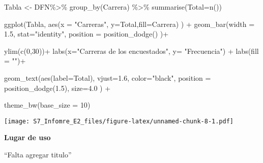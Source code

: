 \documentclass[
]{article}
\newenvironment{Shaded}{\begin{snugshade}}{\end{snugshade}}
\newcommand{\AttributeTok}[1]{\textcolor[rgb]{0.77,0.63,0.00}{#1}}
\newcommand{\DecValTok}[1]{\textcolor[rgb]{0.00,0.00,0.81}{#1}}
\newcommand{\FloatTok}[1]{\textcolor[rgb]{0.00,0.00,0.81}{#1}}
\newcommand{\FunctionTok}[1]{\textcolor[rgb]{0.00,0.00,0.00}{#1}}
\newcommand{\NormalTok}[1]{#1}
\newcommand{\OtherTok}[1]{\textcolor[rgb]{0.56,0.35,0.01}{#1}}
\newcommand{\SpecialCharTok}[1]{\textcolor[rgb]{0.00,0.00,0.00}{#1}}
\newcommand{\StringTok}[1]{\textcolor[rgb]{0.31,0.60,0.02}{#1}}
\begin{document}
\begin{Shaded}
\begin{Highlighting}[]
\NormalTok{Tabla }\OtherTok{\textless{}{-}}\NormalTok{ DFN}\SpecialCharTok{\%\textgreater{}\%} \FunctionTok{group\_by}\NormalTok{(Carrera) }\SpecialCharTok{\%\textgreater{}\%} \FunctionTok{summarise}\NormalTok{(}\AttributeTok{Total=}\FunctionTok{n}\NormalTok{())   }
    
\FunctionTok{ggplot}\NormalTok{(Tabla, }\FunctionTok{aes}\NormalTok{(}\AttributeTok{x =} \StringTok{"Carreras"}\NormalTok{, }\AttributeTok{y=}\NormalTok{Total,}\AttributeTok{fill=}\NormalTok{Carrera) ) }\SpecialCharTok{+}    
  \FunctionTok{geom\_bar}\NormalTok{(}\AttributeTok{width =} \FloatTok{1.5}\NormalTok{, }\AttributeTok{stat=}\StringTok{"identity"}\NormalTok{,              }
           \AttributeTok{position =} \FunctionTok{position\_dodge}\NormalTok{()                 )}\SpecialCharTok{+}  
  
  \FunctionTok{ylim}\NormalTok{(}\FunctionTok{c}\NormalTok{(}\DecValTok{0}\NormalTok{,}\DecValTok{30}\NormalTok{))}\SpecialCharTok{+}
  \FunctionTok{labs}\NormalTok{(}\AttributeTok{x=}\StringTok{"Carreras de los encuestados"}\NormalTok{, }\AttributeTok{y=} \StringTok{"Frecuencia"}\NormalTok{) }\SpecialCharTok{+}   
  \FunctionTok{labs}\NormalTok{(}\AttributeTok{fill =} \StringTok{""}\NormalTok{)}\SpecialCharTok{+}                                         
  
  \FunctionTok{geom\_text}\NormalTok{(}\FunctionTok{aes}\NormalTok{(}\AttributeTok{label=}\NormalTok{Total), }\AttributeTok{vjust=}\FloatTok{1.6}\NormalTok{, }\AttributeTok{color=}\StringTok{"black"}\NormalTok{,    }
              \AttributeTok{position =} \FunctionTok{position\_dodge}\NormalTok{(}\FloatTok{1.5}\NormalTok{),  }\AttributeTok{size=}\FloatTok{4.0}
\NormalTok{            ) }\SpecialCharTok{+}                                            
  
  \FunctionTok{theme\_bw}\NormalTok{(}\AttributeTok{base\_size =} \DecValTok{10}\NormalTok{)}
\end{Highlighting}
\end{Shaded}

\texttt{[image: S7\_Infomre\_E2\_files/figure-latex/unnamed-chunk-8-1.pdf]}

\textbf{Lugar de uso}

``Falta agregar titulo''
\end{document}
